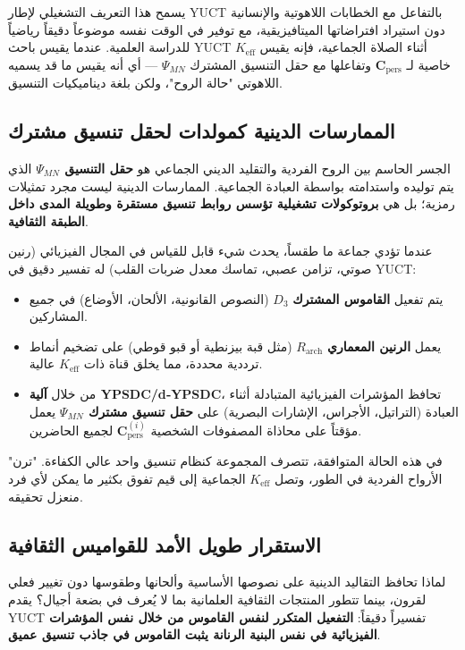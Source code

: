 \documentclass[12pt,a4paper]{article}
\begin{document}
	يسمح هذا التعريف التشغيلي لإطار YUCT بالتفاعل مع الخطابات اللاهوتية والإنسانية دون استيراد افتراضاتها الميتافيزيقية، مع توفير في الوقت نفسه موضوعاً دقيقاً رياضياً للدراسة العلمية. عندما يقيس باحث YUCT \(K_{\mathrm{eff}}\) أثناء الصلاة الجماعية، فإنه يقيس خاصية لـ \(\mathbf{C}_{\text{pers}}\) وتفاعلها مع حقل التنسيق المشترك \(\Psi_{MN}\) — أي أنه يقيس ما قد يسميه اللاهوتي "حالة الروح"، ولكن بلغة ديناميكيات التنسيق.
	
	\subsection{الممارسات الدينية كمولدات لحقل تنسيق مشترك}
	
	الجسر الحاسم بين الروح الفردية والتقليد الديني الجماعي هو \textbf{حقل التنسيق \(\Psi_{MN}\)} الذي يتم توليده واستدامته بواسطة العبادة الجماعية. الممارسات الدينية ليست مجرد تمثيلات رمزية؛ بل هي \textbf{بروتوكولات تشغيلية تؤسس روابط تنسيق مستقرة وطويلة المدى داخل الطبقة الثقافية}.
	
	عندما تؤدي جماعة ما طقساً، يحدث شيء قابل للقياس في المجال الفيزيائي (رنين صوتي، تزامن عصبي، تماسك معدل ضربات القلب) له تفسير دقيق في YUCT:
	\begin{itemize}
		\item يتم تفعيل \textbf{القاموس المشترك} \(D_3\) (النصوص القانونية، الألحان، الأوضاع) في جميع المشاركين.
		\item يعمل \textbf{الرنين المعماري} \(R_{\mathrm{arch}}\) (مثل قبة بيزنطية أو قبو قوطي) على تضخيم أنماط ترددية محددة، مما يخلق قناة ذات \(K_{\mathrm{eff}}\) عالية.
		\item من خلال \textbf{آلية YPSDC/d‑YPSDC}، تحافظ المؤشرات الفيزيائية المتبادلة أثناء العبادة (التراتيل، الأجراس، الإشارات البصرية) على \textbf{حقل تنسيق مشترك \(\Psi_{MN}\)} يعمل مؤقتاً على محاذاة المصفوفات الشخصية \(\mathbf{C}_{\text{pers}}^{(i)}\) لجميع الحاضرين.
	\end{itemize}
	
	في هذه الحالة المتوافقة، تتصرف المجموعة كنظام تنسيق واحد عالي الكفاءة. "ترن" الأرواح الفردية في الطور، وتصل \(K_{\mathrm{eff}}\) الجماعية إلى قيم تفوق بكثير ما يمكن لأي فرد منعزل تحقيقه.
	
	\subsection{الاستقرار طويل الأمد للقواميس الثقافية}
	
	لماذا تحافظ التقاليد الدينية على نصوصها الأساسية وألحانها وطقوسها دون تغيير فعلي لقرون، بينما تتطور المنتجات الثقافية العلمانية بما لا يُعرف في بضعة أجيال؟ يقدم YUCT تفسيراً دقيقاً: \textbf{التفعيل المتكرر لنفس القاموس من خلال نفس المؤشرات الفيزيائية في نفس البنية الرنانة يثبت القاموس في جاذب تنسيق عميق}.
	
\end{document}
